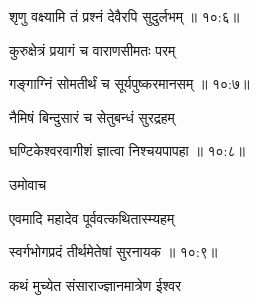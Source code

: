 
{\devanagarifont शृणु वक्ष्यामि तं प्रश्नं देवैरपि सुदुर्लभम् {॥ १०:६॥} \veg\dontdisplaylinenum }%

{\devanagarifont कुरुक्षेत्रं प्रयागं च वाराणसीमतः परम् \thinspace{\dandab} \dontdisplaylinenum }%
 

{\devanagarifont गङ्गाग्निं सोमतीर्थं च सूर्यपुष्करमानसम् {॥ १०:७॥} \veg\dontdisplaylinenum }%

{\devanagarifont नैमिषं बिन्दुसारं च सेतुबन्धं सुरद्रहम् \thinspace{\dandab} \dontdisplaylinenum }%


{\devanagarifont घण्टिकेश्वरवागीशं ज्ञात्वा निश्चयपापहा {॥ १०:८॥} \veg\dontdisplaylinenum }%

{\devanagarifont उमोवाच {\dandab}\dontdisplaylinenum  }%
 
{\devanagarifont एवमादि महादेव पूर्ववत्कथितास्म्यहम् \thinspace{\danda} \dontdisplaylinenum }%


{\devanagarifont स्वर्गभोगप्रदं तीर्थमेतेषां सुरनायक {॥ १०:९॥} \veg\dontdisplaylinenum }%

{\devanagarifont कथं मुच्येत संसाराज्ज्ञानमात्रेण ईश्वर \thinspace{\dandab} \dontdisplaylinenum }%

